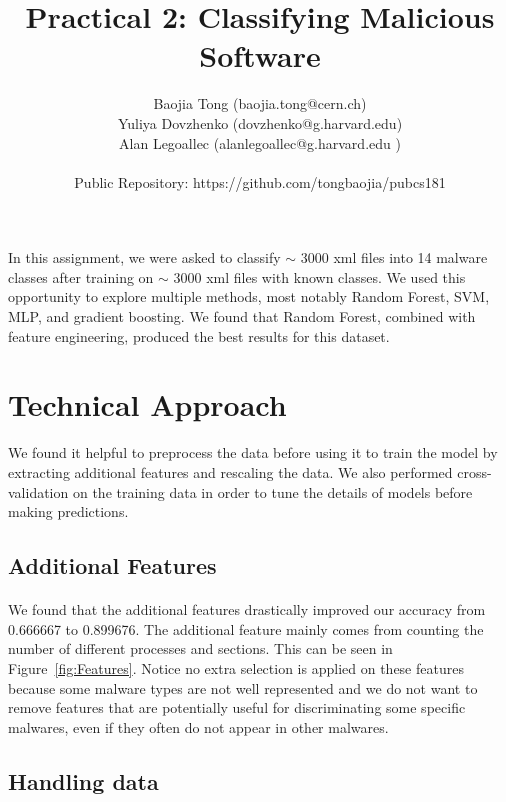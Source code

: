 \documentclass[11pt]{article}
\title{Practical 2: Classifying Malicious Software}
\author{ Baojia Tong (baojia.tong@cern.ch)\\Yuliya Dovzhenko (dovzhenko@g.harvard.edu)\\Alan Legoallec (alanlegoallec@g.harvard.edu )\\\\Public Repository: https://github.com/tongbaojia/pubcs181}
\begin{document}
\maketitle{}


\noindent In this assignment, we were asked to classify $\sim$ 3000 xml files into 14 malware classes after training on $\sim$ 3000 xml files with known classes. We used this opportunity to explore multiple methods, most notably Random Forest, SVM, MLP, and gradient boosting. We found that Random Forest, combined with feature engineering, produced the best results for this dataset. 

\section{Technical Approach}
We found it helpful to preprocess the data before using it to train the model by extracting additional features and rescaling the data. We also performed cross-validation on the training data in order to tune the details of models before making predictions.

\subsection{Additional Features}
\paragraph{}
We found that the additional features drastically improved our accuracy from 0.666667 to 0.899676. The additional feature mainly comes from counting the number of different processes and sections. This can be seen in Figure~\ref{fig:Features}. Notice no extra selection is applied on these features because some malware types are not well represented and we do not want to remove features that are potentially useful for discriminating some specific malwares, even if they often do not appear in other malwares.


\subsection{Handling data}
\end{document}
